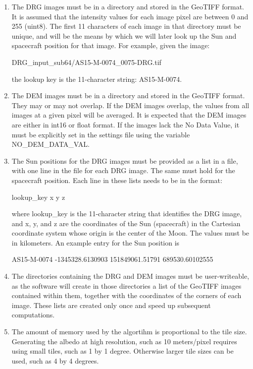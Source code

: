 \documentclass{article}
\begin{document}
\begin{enumerate}

\item The DRG images must be in a directory and stored in the GeoTIFF format. It is assumed that the intensity values for each image pixel are between 0 and 255 (uint8).  The first 11 characters of each image in that directory must be unique, and will be the means by which we will later look up the Sun and spacecraft position for that image. For example, given the image:

DRG\_input\_sub64/AS15-M-0074\_0075-DRG.tif

the lookup key is the 11-character string: AS15-M-0074.

\item The DEM images must be in a directory and stored in the GeoTIFF
format. They may or may not overlap. If the DEM images overlap, the
values from all images at a given pixel will be averaged. It is expected
that the DEM images are either in int16 or float format. If the
images lack the No Data Value, it must be explicitly set in the
settings file using the variable NO\_DEM\_DATA\_VAL.

\item The Sun positions for the DRG images must be provided as a list in
  a file, with one line in the file for each DRG image. The same must
  hold for the spacecraft position. Each line in these lists needs to
  be in the format: 

lookup\_key x y z

where lookup\_key is the 11-character string that identifies the DRG
image, and x, y, and z are the coordinates of the Sun (spacecraft)
 in the Cartesian coordinate system whose origin is the center of the
 Moon. The values must be in kilometers. An example entry for the Sun
 position is 

AS15-M-0074 -1345328.6130903 151849061.51791 689530.60102555

\item The directories containing the DRG and DEM images must be
  user-writeable, as the software will create in those directories a
  list of the GeoTIFF images contained within them, together with the
  coordinates of the corners of each image. These lists are created
  only once and speed up subsequent computations.

\item The amount of memory used by the algortihm is proportional to the tile
size. Generating the albedo at high resolution, such as 10 meters/pixel
requires using small tiles, such as 1 by 1 degree. Otherwise larger tile
sizes can be used, such as 4 by 4 degrees.

\end{enumerate}
\end{document}
